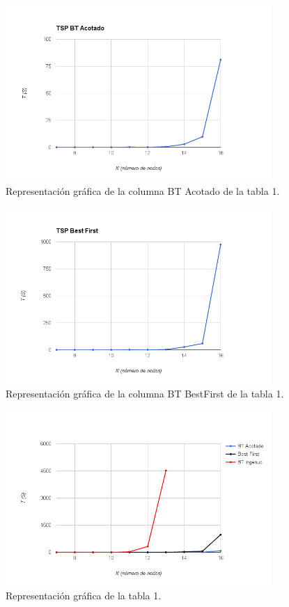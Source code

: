\documentclass[es]{ifirak}
\begin{document}
\begin{figure}[htbp]
	\centering
	\includegraphics[width=0.9\textwidth]{BTAC.png}
	\caption{Representación gráfica de la columna BT Acotado de la tabla 1.}\label{figure}
\end{figure}

\begin{figure}[htbp]
	\centering
	\includegraphics[width=0.9\textwidth]{BTBF.png}
	\caption{Representación gráfica de la columna BT BestFirst de la tabla 1.}\label{figure}
\end{figure}

\begin{figure}[htbp]
	\centering
	\includegraphics[width=0.9\textwidth]{BTTODOS.png}
	\caption{Representación gráfica de la tabla 1.}\label{figure}
\end{figure}
\end{document}
